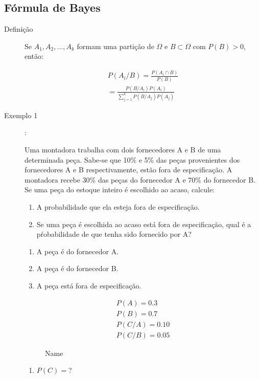    \subsection{Fórmula de Bayes}
   \begin{description}
     \item [Definição] Se $A_1,A_2,\ldots, A_k$ formam uma partição de $\Omega$ e 
       $B \subset \Omega$ com $P(B)>0$, então:

       \begin{align}
         P(A_i/ B)= \frac{P(A_i \cap B)}{P(B)}\\ \nonumber
         =\frac{P(B/A_i)P(A_i)}{\sum_{j=1}^k P(B/A_j)P(A_j)}
       \end{align}

     \item [Exemplo 1]: 

       Uma montadora trabalha com dois fornecedores A e B de uma determinada peça.
       Sabe-se que 10\% e 5\% das peças provenientes dos fornecedores A e B respectivamente,
       estão fora de especificação. A montadora recebe 30\% das peças do fornecedor A e 70\%
       do fornecedor B. Se uma peça do estoque inteiro é escolhido ao acaso, calcule:

       \begin{enumerate}
         \item A probabilidade que ela esteja fora de especificação.
         \item Se uma peça é escolhida ao acaso está fora de especificação, qual é a 
           pŕobabilidade de que tenha sido fornecido por A?
       \end{enumerate}
       \begin{enumerate}[label=\Alph*:]
         \item  A peça é do fornecedor A.
         \item  A peça é do fornecedor B.
         \item  A peça está fora de especificação.
       \end{enumerate}
       \begin{align*}
         P(A)= 0.3\\
         P(B)=0.7\\
         P(C/A)= 0.10\\
         P(C/B)= 0.05
       \end{align*}
       \begin{figure}[htpb]
         \centering
         \caption{Name}
         \label{fig:21}
       \end{figure}
       \begin{enumerate}[label=(\alph*)]
         \item $P(C)=$?


\end{enumerate}
\end{description}
